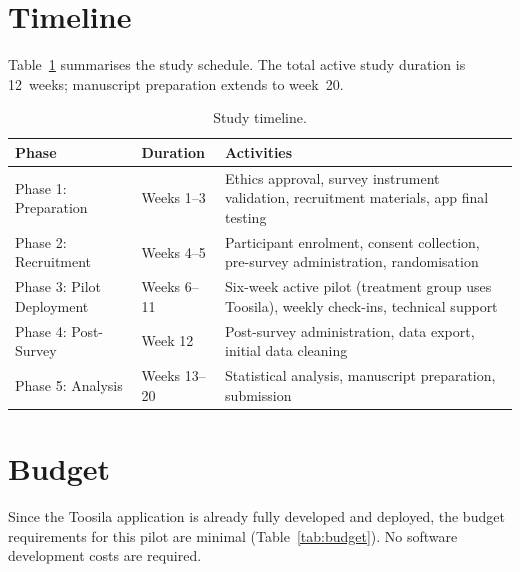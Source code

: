 \documentclass[12pt,a4paper]{article}
\begin{document}
\section{Timeline}
\label{sec:timeline}

Table~\ref{tab:timeline} summarises the study schedule. The total active study duration is 12~weeks; manuscript preparation extends to week~20.

\begin{table}[htbp]
  \centering
  \caption{Study timeline.}
  \label{tab:timeline}
  \begin{tabular}{@{}llp{8cm}@{}}
    \toprule
    \textbf{Phase} & \textbf{Duration} & \textbf{Activities} \\
    \midrule
    Phase 1: Preparation       & Weeks 1--3   & Ethics approval, survey instrument validation, recruitment materials, app final testing \\
    Phase 2: Recruitment       & Weeks 4--5   & Participant enrolment, consent collection, pre-survey administration, randomisation \\
    Phase 3: Pilot Deployment  & Weeks 6--11  & Six-week active pilot (treatment group uses Toosila), weekly check-ins, technical support \\
    Phase 4: Post-Survey       & Week 12      & Post-survey administration, data export, initial data cleaning \\
    Phase 5: Analysis          & Weeks 13--20 & Statistical analysis, manuscript preparation, submission \\
    \bottomrule
  \end{tabular}
\end{table}

\section{Budget}
\label{sec:budget}

Since the Toosila application is already fully developed and deployed, the budget requirements for this pilot are minimal (Table~\ref{tab:budget}). No software development costs are required.
\end{document}
